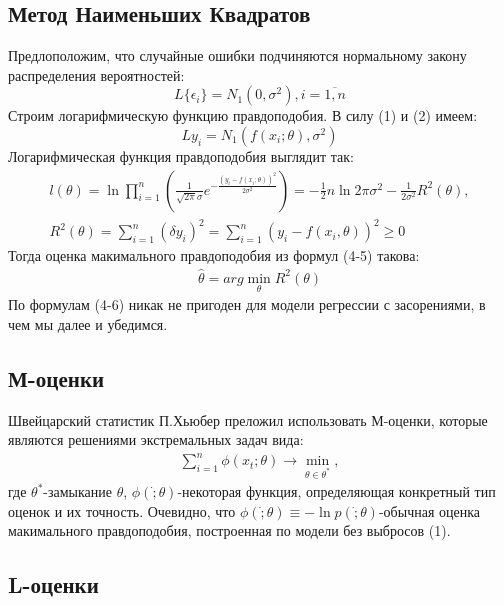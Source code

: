 \documentclass[12pt]{article}
\begin{document}
\subsection{Метод Наименьших Квадратов}
Предлоположим, что случайные ошибки подчиняются нормальному закону распределения вероятностей:
\begin{equation}
    L\{\epsilon_i\}=N_1(0,\sigma^2), i = \overline{1,n}
\end{equation}
Строим логарифмическую функцию правдоподобия. В силу (1) и (2) имеем:
\begin{equation}
    L{y_i}=N_1(f(x_i;\theta), \sigma^2)
\end{equation}
Логарифмическая функция правдоподобия выглядит так\cite{Kharin}:
\begin{eqnarray}
    l(\theta)=\ln \prod_{i=1}^{n}(\frac{1}{\sqrt{2\pi}\sigma}e^{-\frac{(y_i-f(x_i;\theta))^2}{2\sigma^2}})=-\frac{1}{2}n\ln{2\pi\sigma^2}-\frac{1}{2\sigma^2}R^2(\theta),\\
    R^2(\theta)=\sum_{i=1}^{n}(\delta y_i)^2=\sum_{i=1}^{n}(y_i-f(x_i,\theta))^2\geq 0
\end{eqnarray}
Тогда оценка макимального правдоподобия из формул (4-5) такова:
\begin{eqnarray}
    \hat{\theta}=arg \min_{\theta}R^2(\theta)
\end{eqnarray}
По формулам (4-6) никак не пригоден для модели регрессии с засорениями, в чем мы далее и убедимся.
\subsection{М-оценки}
Швейцарский статистик П.Хьюбер преложил использовать М-оценки\cite{Kharin}, которые являются решениями экстремальных задач вида:
\begin{eqnarray}
    \sum_{i=1}^{n}\phi(x_t;\theta)\rightarrow \min_{\theta\in \theta^{*}},
\end{eqnarray}
где $\theta^{*}$-замыкание $\theta$, $\phi(\dot;\theta)$-некоторая функция, определяющая конкретный тип оценок и их точность.\hfill\break
Очевидно, что $\phi(\dot;\theta)\equiv - \ln{p(\dot;\theta)}$-обычная оценка макимального правдоподобия, построенная по модели без выбросов (1).
\subsection{L-оценки}
\end{document}
